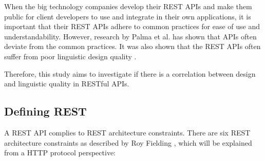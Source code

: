 \documentclass[a4paper,12pt]{article}
\begin{document}
When the big technology companies develop their REST APIs and make them public for client developers to use and integrate in their own applications, it is important that their REST APIs adhere to common practices for ease of use and understandability. However, research by Palma et al. \cite{design} has shown that APIs often deviate from the common practices. It was also shown that the REST APIs often suffer from poor linguistic design quality \cite{linguistic}.

Therefore, this study aims to investigate if there is a correlation between design and linguistic quality in RESTful APIs.

\subsection{Defining REST}

A REST API complies to REST architecture constraints. There are six REST architecture constraints as described by Roy Fielding \cite{restdissertation}, which will be explained from a HTTP protocol perspective:
\end{document}
